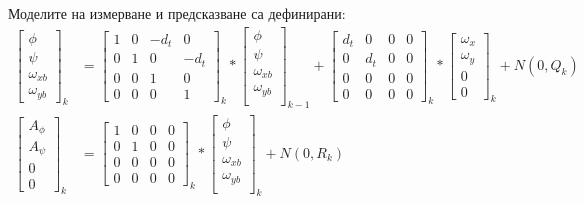 Моделите на измерване и предсказване са дефинирани:
\begin{align}
    \begin{bmatrix}
        \phi\\
        \psi\\
        \omega_{xb}\\
        \omega_{yb}
    \end{bmatrix}_k &=
    \begin{bmatrix}
        1 & 0 & -d_t & 0 \\
        0 & 1 & 0 & -d_t \\
        0 & 0 & 1 & 0 \\
        0 & 0 & 0 & 1
    \end{bmatrix}_k *
    \begin{bmatrix}
        \phi\\
        \psi\\
        \omega_{xb}\\
        \omega_{yb}\\
    \end{bmatrix}_{k-1}
    +
    \begin{bmatrix}
        d_t & 0 & 0 & 0 \\
        0 & d_t & 0 & 0 \\
        0 & 0 & 0 & 0   \\
        0 & 0 & 0 & 0
    \end{bmatrix}_k *
    \begin{bmatrix}
        \omega_{x}\\
        \omega_{y}\\
        0 \\
        0
    \end{bmatrix}_{k}
    +
    N(0, Q_k) \\
    \begin{bmatrix}
        A_\phi\\
        A_\psi\\
        0\\
        0
    \end{bmatrix}_k &=
    \begin{bmatrix}
        1 & 0 & 0 & 0 \\
        0 & 1 & 0 & 0 \\
        0 & 0 & 0 & 0 \\
        0 & 0 & 0 & 0
    \end{bmatrix}_k *
    \begin{bmatrix}
        \phi\\
        \psi\\
        \omega_{xb}\\
        \omega_{yb}\\
    \end{bmatrix}_{k}
    +
    N(0,R_k)
\end{align}

